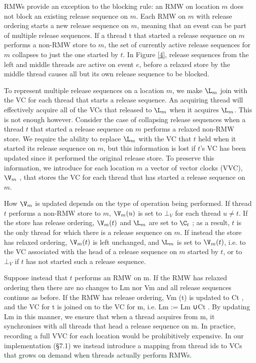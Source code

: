 \documentclass[11pt]{article}
\begin{document}
RMWs provide an exception to the blocking rule: an RMW on location \(m\) does not block an existing
release sequence on \(m\). Each RMW on \(m\) with release ordering starts a new release sequence on
\(m\), meaning that an event can be part of multiple release sequences. If a thread t that started a
release sequence on \(m\) performs a non-RMW store to \(m\), the set of currently active release
sequences for \(m\) collapses to just the one started by \(t\).
In Figure \ref{4}, release sequences from the left and middle threads are active on event \(e\), before a
relaxed store by the middle thread causes all but its own release sequence to be blocked.

To represent multiple release sequences on a location \(m\), we make \(\L_m\) join with the VC for
each thread that starts a release sequence. An acquiring thread will effectively acquire all of the
VCs that released to \(\L_m\) when it acquires \(\L_m\). This is not enough however. Consider the case
of collapsing release sequences when a thread \(t\) that started a release sequence on \(m\) performs
a relaxed non-RMW store. We require the ability to replace \(\L_m\) with the VC that \(t\) held when
it started its release sequence on \(m\), but this information is lost if \(t\)'s VC has been updated
since it performed the original release store. To preserve this information, we introduce for each
location \(m\) a vector of vector clocks (VVC), \(\V_m\) , that stores the VC for each thread that has
started a release sequence  on \(m\).

How \(\V_m\) is updated depends on the type of operation being performed. If thread \(t\) performs a
non-RMW store to \(m\), \(\V_m(u)\) is set to \(\bot_V\) for each thread \(u\neq t\). If the store has
release ordering, \(\V_m(t)\) and \(\L_m\) are set to \(\C_t\) ; as a result, \(t\) is the only thread
for which there is a release sequence on \(m\). If instead the store has relaxed ordering, \(\V_m(t)\)
is left unchanged, and \(\L_m\) is set to \(\V_m(t)\), i.e. to the VC associated with the head of a
release sequence on \(m\) started by \(t\), or to \(\bot_V\) if \(t\) has not started such a release
sequence.

        Suppose instead that \(t\) performs an RMW on m. If the RMW
has relaxed ordering then there are no changes to Lm nor Vm and
all release sequences continue as before. If the RMW has release
ordering, Vm (t) is updated to Ct , and the VC for t is joined on to
the VC for m, i.e. Lm := Lm ∪Ct . By updating Lm in this manner,
we ensure that when a thread acquires from m, it synchronises with
all threads that head a release sequence on m.
In practice, recording a full VVC for each location would be
prohibitively expensive. In our implementation (§7.1) we instead
introduce a mapping from thread ids to VCs that grows on demand
when threads actually perform RMWs.
\end{document}
